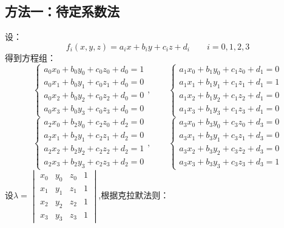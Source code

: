 \documentclass[12pt,a4paper]{article}
\begin{document}
\subsection*{方法一：待定系数法}设：
$$
f_i(x,y,z)=a_ix+b_iy+c_iz+d_i\qquad i=0,1,2,3
$$
得到方程组：
$$
\begin{cases}
a_0x_0+b_0y_0+c_0z_0+d_0=1\\
a_0x_1+b_0y_1+c_0z_1+d_0=0\\
a_0x_2+b_0y_2+c_0z_2+d_0=0\\
a_0x_3+b_0y_3+c_0z_3+d_0=0
\end{cases},\qquad
\begin{cases}
a_1x_0+b_1y_0+c_1z_0+d_1=0\\
a_1x_1+b_1y_1+c_1z_1+d_1=1\\
a_1x_2+b_1y_2+c_1z_2+d_1=0\\
a_1x_3+b_1y_3+c_1z_3+d_1=0
\end{cases}
$$
$$
\begin{cases}
a_2x_0+b_2y_0+c_2z_0+d_2=0\\
a_2x_1+b_2y_1+c_2z_1+d_2=0\\
a_2x_2+b_2y_2+c_2z_2+d_2=1\\
a_2x_3+b_2y_3+c_2z_3+d_2=0
\end{cases},\qquad
\begin{cases}
a_3x_0+b_3y_0+c_3z_0+d_3=0\\
a_3x_1+b_3y_1+c_3z_1+d_3=0\\
a_3x_2+b_3y_2+c_3z_2+d_3=0\\
a_3x_3+b_3y_3+c_3z_3+d_3=1
\end{cases}
$$
设$\lambda=\begin{vmatrix}
             x_0&y_0&z_0&1\\
             x_1&y_1&z_1&1\\
             x_2&y_2&z_2&1\\
             x_3&y_3&z_3&1
\end{vmatrix}$,根据克拉默法则：
\end{document}
